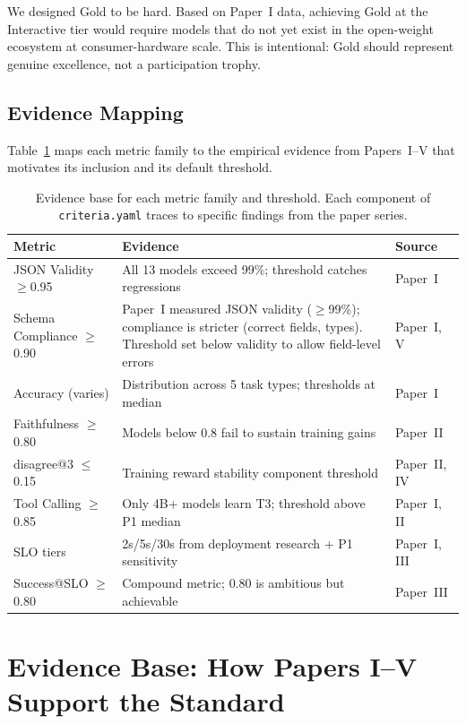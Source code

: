 \documentclass[11pt]{article}
\newcommand{\criteriayaml}{\texttt{criteria.yaml}}
\begin{document}
We designed Gold to be hard. Based on Paper~I data, achieving Gold at the Interactive tier would require models that do not yet exist in the open-weight ecosystem at consumer-hardware scale. This is intentional: Gold should represent genuine excellence, not a participation trophy.

\subsection{Evidence Mapping}

Table~\ref{tab:evidence} maps each metric family to the empirical evidence from Papers~I--V that motivates its inclusion and its default threshold.

\begin{table}[t]
\centering
\caption{Evidence base for each metric family and threshold. Each component of \criteriayaml{} traces to specific findings from the paper series.}
\label{tab:evidence}
\small
\begin{tabularx}{\linewidth}{lXl}
\toprule
\textbf{Metric} & \textbf{Evidence} & \textbf{Source} \\
\midrule
JSON Validity $\geq$0.95 & All 13 models exceed 99\%; threshold catches regressions & Paper~I \\
Schema Compliance $\geq$0.90 & Paper~I measured JSON validity ($\geq$99\%); compliance is stricter (correct fields, types). Threshold set below validity to allow field-level errors & Paper~I, V \\
Accuracy (varies) & Distribution across 5 task types; thresholds at median & Paper~I \\
Faithfulness $\geq$0.80 & Models below 0.8 fail to sustain training gains & Paper~II \\
disagree@3 $\leq$0.15 & Training reward stability component threshold & Paper~II, IV \\
Tool Calling $\geq$0.85 & Only 4B+ models learn T3; threshold above P1 median & Paper~I, II \\
SLO tiers & 2s/5s/30s from deployment research + P1 sensitivity & Paper~I, III \\
Success@SLO $\geq$0.80 & Compound metric; 0.80 is ambitious but achievable & Paper~III \\
\bottomrule
\end{tabularx}
\end{table}


\section{Evidence Base: How Papers I--V Support the Standard}
\label{sec:evidence}
\end{document}
